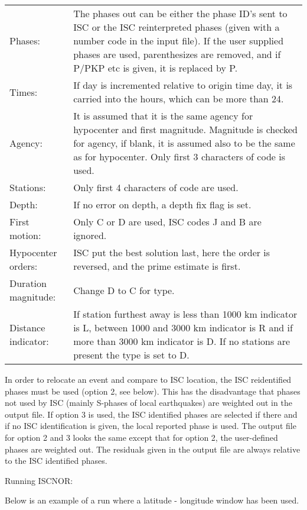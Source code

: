 \begin{tabular}{lp{10cm}}
Phases: & The phases out can be either the phase ID's sent to ISC or the ISC reinterpreted phases 
(given with a number code in the input file). If the user supplied phases are used, 
parenthesizes are removed, and if P/PKP etc is given, it is replaced by P. \\
Times: & If day is incremented relative to origin time day, it is carried into the hours, which can be 
more than 24. \\
Agency: & It is assumed that it is the same agency for hypocenter and first magnitude. Magnitude is    
checked for agency, if blank, it is assumed also to be the same as for hypocenter. Only first 
3 characters of code is used. \\
Stations: & Only first 4 characters of code are used. \index{Station, only 4 characters} \\
Depth: & If no error on depth, a depth fix flag is set. \\
First motion: & Only C or D are used, ISC codes J and B are ignored. \\
Hypocenter orders: & ISC put the best solution last, here the order is reversed, and the prime estimate 
is  first. \\
Duration magnitude: & Change D to C for type. \\
Distance indicator: & If station furthest away is less than 1000 km indicator is L, between 1000 and 
3000 km indicator is R and if more than 3000 km indicator is D. 
If no stations are present  the type is set to D. 
\end{tabular}

In order to relocate an event and compare to ISC location, the ISC reidentified phases must be used (option 2, see below). This has the disadvantage that phases not used by ISC (mainly S-phases of local earthquakes) are weighted out in the output file. If option 3 is used, the ISC identified phases are selected if there and if no ISC identification is given, the local reported phase is used. The output file for option 2 and 3 looks the same except that for option 2, the user-defined phases are weighted out. The residuals given in the output file are always relative to the ISC identified phases. 

Running ISCNOR: 

Below is an example of a run where a latitude - longitude window has been used.  



